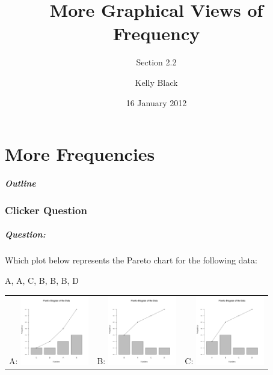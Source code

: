 
\part{More Frequencies}

\title{More Graphical Views of Frequency}
\subtitle{Section 2.2}

\author{Kelly Black}
\date{16 January 2012}

\begin{frame}
  \titlepage
\end{frame}

\begin{frame}
  \frametitle{Outline}
  \tableofcontents[pausesection,hideallsubsections,part=1]
\end{frame}


\section{Clicker Question}


\begin{frame}
  \frametitle{Question:}

  Which plot below represents the Pareto chart for the following data:

    A, A, C, B, B, B, D

    \begin{tabular}{ccc}
      A: \includegraphics[width=3cm]{img/paretoQuizW1D2-a} &
      B: \includegraphics[width=3cm]{img/paretoQuizW1D2-b} &
      C: \includegraphics[width=3cm]{img/paretoQuizW1D2-c}
  \end{tabular}

\end{frame}


